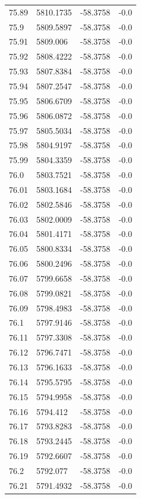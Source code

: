 \begin{table}[H]
\begin{tabular}{llll}
75.89 & 5810.1735 & -58.3758 & -0.0 \\
75.9 & 5809.5897 & -58.3758 & -0.0 \\
75.91 & 5809.006 & -58.3758 & -0.0 \\
75.92 & 5808.4222 & -58.3758 & -0.0 \\
75.93 & 5807.8384 & -58.3758 & -0.0 \\
75.94 & 5807.2547 & -58.3758 & -0.0 \\
75.95 & 5806.6709 & -58.3758 & -0.0 \\
75.96 & 5806.0872 & -58.3758 & -0.0 \\
75.97 & 5805.5034 & -58.3758 & -0.0 \\
75.98 & 5804.9197 & -58.3758 & -0.0 \\
75.99 & 5804.3359 & -58.3758 & -0.0 \\
76.0 & 5803.7521 & -58.3758 & -0.0 \\
76.01 & 5803.1684 & -58.3758 & -0.0 \\
76.02 & 5802.5846 & -58.3758 & -0.0 \\
76.03 & 5802.0009 & -58.3758 & -0.0 \\
76.04 & 5801.4171 & -58.3758 & -0.0 \\
76.05 & 5800.8334 & -58.3758 & -0.0 \\
76.06 & 5800.2496 & -58.3758 & -0.0 \\
76.07 & 5799.6658 & -58.3758 & -0.0 \\
76.08 & 5799.0821 & -58.3758 & -0.0 \\
76.09 & 5798.4983 & -58.3758 & -0.0 \\
76.1 & 5797.9146 & -58.3758 & -0.0 \\
76.11 & 5797.3308 & -58.3758 & -0.0 \\
76.12 & 5796.7471 & -58.3758 & -0.0 \\
76.13 & 5796.1633 & -58.3758 & -0.0 \\
76.14 & 5795.5795 & -58.3758 & -0.0 \\
76.15 & 5794.9958 & -58.3758 & -0.0 \\
76.16 & 5794.412 & -58.3758 & -0.0 \\
76.17 & 5793.8283 & -58.3758 & -0.0 \\
76.18 & 5793.2445 & -58.3758 & -0.0 \\
76.19 & 5792.6607 & -58.3758 & -0.0 \\
76.2 & 5792.077 & -58.3758 & -0.0 \\
76.21 & 5791.4932 & -58.3758 & -0.0 \\

\end{tabular}
\end{table}
